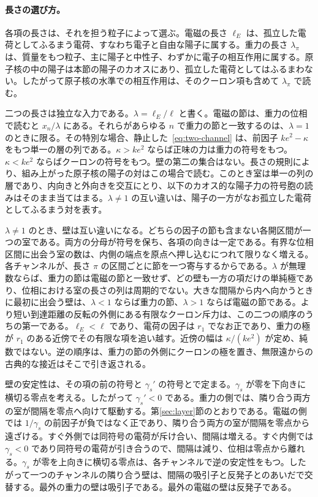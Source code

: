 \documentclass[a4paper]{article}
\begin{document}
\paragraph{長さの選び方。}\label{rule:length}
各項の長さは、それを担う粒子によって選ぶ。電磁の長さ \(\ell_E\) は、孤立した電荷としてふるまう電荷、すなわち電子と自由な陽子に属する。重力の長さ \(\lambda_\pi\) は、質量をもつ粒子、主に陽子と中性子、わずかに電子の相互作用に属する。原子核の中の陽子は本節の陽子のカオスにあり、孤立した電荷としてはふるまわない。したがって原子核の水準での相互作用は、そのクーロン項も含めて \(\lambda_\pi\) で読む。

二つの長さは独立な入力である。\(\lambda=\ell_E/\ell\) と書く。電磁の節は、重力の位相で読むと \(x_n/\lambda\) にある。それらがあらゆる \(n\) で重力の節と一致するのは、\(\lambda=1\) のときに限る。その特別な場合、静止した~\eqref{eq:two-channel} は、前因子 \(k e^{2}-\kappa\) をもつ単一の層の列である。\(\kappa>k e^{2}\) ならば正味の力は重力の符号をもつ。\(\kappa<k e^{2}\) ならばクーロンの符号をもつ。壁の第二の集合はない。長さの規則により、組み上がった原子核の陽子の対はこの場合で読む。このとき室は単一の列の層であり、内向きと外向きを交互にとり、以下のカオス的な陽子力の符号胞の読みはそのまま当てはまる。\(\lambda\neq 1\) の互い違いは、陽子の一方がなお孤立した電荷としてふるまう対を表す。

\(\lambda\neq 1\) のとき、壁は互い違いになる。どちらの因子の節も含まない各開区間が一つの室である。両方の分母が符号を保ち、各項の向きは一定である。有界な位相区間に出会う室の数は、内側の端点を原点へ押し込むにつれて限りなく増える。各チャンネルが、長さ \(\pi\) の区間ごとに節を一つ寄与するからである。\(\lambda\) が無理数ならば、重力の節は電磁の節と一致せず、どの壁も一方の項だけの単純極であり、位相における室の長さの列は周期的でない。大きな間隔から内へ向かうときに最初に出会う壁は、\(\lambda<1\) ならば重力の節、\(\lambda>1\) ならば電磁の節である。より短い到達距離の反転の外側にある有限なクーロン斥力は、この二つの順序のうちの第一である。\(\ell_E<\ell\) であり、電荷の因子は \(r_1\) でなお正であり、重力の極が \(r_1\) のある近傍でその有限な項を追い越す。近傍の幅は \(\kappa/(k e^{2})\) が定め、純数ではない。逆の順序は、重力の節の外側にクーロンの極を置き、無限遠からの古典的な接近はそこで引き返される。

壁の安定性は、その項の前の符号と \(\gamma_s'\) の符号とで定まる。\(\gamma_s\) が零を下向きに横切る零点を考える。したがって \(\gamma_s'<0\) である。重力の側では、隣り合う両方の室が間隔を零点へ向けて駆動する。第\ref{sec:layer}節のとおりである。電磁の側では \(1/\gamma_s\) の前因子が負ではなく正であり、隣り合う両方の室が間隔を零点から遠ざける。すぐ外側では同符号の電荷が斥け合い、間隔は増える。すぐ内側では \(\gamma_s<0\) であり同符号の電荷が引き合うので、間隔は減り、位相は零点から離れる。\(\gamma_s\) が零を上向きに横切る零点は、各チャンネルで逆の安定性をもつ。したがって一つのチャンネルの隣り合う壁は、間隔の吸引子と反発子とのあいだで交替する。最外の重力の壁は吸引子である。最外の電磁の壁は反発子である。
\end{document}
